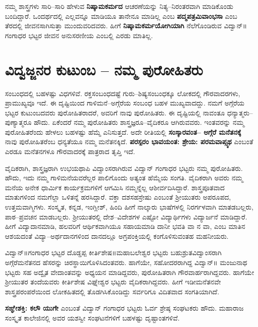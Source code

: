{ನಮ್ಮ ಶಾಸ್ತ್ರಗಳು ಸಾರಿ–ಸಾರಿ ಹೇಳುವ \textbf{ನಿಷ್ಕಾಮಕರ್ಮದ} ಆಚರಣೆಯನ್ನು ನಿತ್ಯ–ನಿರಂತರವಾಗಿ ಮಾಡಿಕೊಂಡು ಬಂದಿದ್ದಾರೆ. ಒಂದರ್ಥದಲ್ಲಿ ಎಲ್ಲವನ್ನೂ ಮಾಡಿಯೂ ತಾನೇನೂ ಮಾಡಿಲ್ಲ ಎಂಬ \textbf{ಪದ್ಮಪತ್ರಮಿವಾಂಭಸಾ} ಎಂಬ ತೆರದಲ್ಲಿ ಜೀವನಸಾಗಿಸುತ್ತಾ ಮುಂದುವರಿದವರು. ಹೀಗೆ \textbf{ನಿಷ್ಕಾಮಕರ್ಮಯೋಗಿಯಾಗಿ} ನೆಲೆಗೊಂಡಿರುವ ವಿದ್ವಾನ್॥ಗಂಗಾಧರ ಭಟ್ಟರ ಜೀವನ ಅನುಸರಣೀಯ ಎಂಬಲ್ಲಿ ಎರಡು ಮಾತಿಲ್ಲ.

\section*{ವಿದ್ವಜ್ಜನರ ಕುಟುಂಬ – ನಮ್ಮ ಪುರೋಹಿತರು}

ಸಂಬಂಧದಲ್ಲಿ ಬಹಳಷ್ಟು ವಿಧಗಳಿವೆ. ರಕ್ತಸಂಬಂಧದಷ್ಟೆ ಗುರು–ಶಿಷ್ಯಸಂಬಂಧಕ್ಕೂ ಲೋಕದಲ್ಲಿ ಗೌರವಾದರಗಳು, ಪ್ರಾಮುಖ್ಯವೂ ಇದೆ. ಈ ದೃಷ್ಟಿಯಿಂದ ಗಾಳಿಮನೆ–ಅಗ್ಗೆರೆಯ ಸಂಬಂಧ ಬಹಳ ಮುಖ್ಯವಾದದ್ದು.  ನಮಗೆ ಅಗ್ಗೆರೆಯ ಭಟ್ಟರ ಕುಟುಂಬದವರು ಪುರೋಹಿತರಾದರೆ, ಅವರಿಗೆ ನಾವು ಪುರೋಹಿತರು. ಈ ದೃಷ್ಟಿಯಲ್ಲಿ ನಾವಂತೂ ಧನ್ಯಾತ್ಮರು–ಪುಣ್ಯಾತ್ಮರೂ ಹೌದು. ಏಕೆಂದರೆ ನಮ್ಮ ಪುರೋಹಿತರು ಶಾಸ್ತ್ರಜ್ಞರೂ–ವೈದಿಕರೂ ಆಗಿರುವವರು. ಇಂತವರನ್ನು ನಮ್ಮ ಪುರೋಹಿತರೆಂದು ಹೇಳಲು ಬಹಳಷ್ಟು ಹೆಮ್ಮೆ ಎನಿಸುತ್ತದೆ. ಅದೇ ರೀತಿಯಲ್ಲಿ \textbf{ಸಂಸ್ಕಾರವಂತ– ಅಗ್ಗೆರೆ ಮನೆತನಕ್ಕೆ} ನಾವು ಪುರೋಹಿತರೆಂಬ ಧನ್ಯತೆಯೂ ನಮ್ಮ ಮನೆತನಕ್ಕಿದೆ. \textbf{ಪರಸ್ಪರಂ ಭಾವಯಂತ: ಶ್ರೇಯ: ಪರಮವಾಪ್ಸ್ಯಥ}  ಎಂಬಂತೆ ಎರಡೂ ಮನೆತನಗಳೂ ಗೌರವಾದರಕ್ಕೆ ಪಾತ್ರರಾದ ತೃಪ್ತಿ ಇದೆ. 

ವೈದಿಕರಾಗಿ, ಶಾಸ್ತ್ರಜ್ಞರಾಗಿ ಉಭಯಥಾಪಿ ವಿದ್ವಾಂಸರಾಗಿರುವ ವಿದ್ವಾನ್ ಗಂಗಾಧರ ಭಟ್ಟರು ನಮ್ಮ ಪುರೋಹಿತರು. ಹೌದು, ಇದು ನಮ್ಮ ಗಾಳಿಮನೆಯವರೆಲ್ಲರ ಪಾಲಿಗೊಂದು ಅತ್ಯಂತ ಹೆಮ್ಮೆಯ ಸಂಗತಿ. ವೈದಿಕರಾಗಿ ಅವರು ನಮ್ಮ ಮನೆಯ ಅನೇಕ ಧಾರ್ಮಿಕ ಕಾರ್ಯಕ್ರಮಗಳಿಗೆ ಆಗಮಿಸಿ ನಮ್ಮನ್ನೆಲ್ಲ ಆಶೀರ್ವದಿಸಿದ್ದಾರೆ. ಶಾಸ್ತ್ರಪೂತವಾದ ಮಾತುಗಳಿಂದ ನಮಗೆಲ್ಲಾ ಒಳಿತನ್ನೆ ಹರಸಿದ್ದಾರೆ. ವಕ್ತಾ ದಶಸಹಸ್ರೇಷು ಎಂಬಂತೆ ಶ್ರೀಯುತರು ಅಪರೂಪದ, ಉತ್ತಮವಾಗ್ಮಿಗಳು. ಸಂಸ್ಕೃತ, ಕನ್ನಡ, ಇಂಗ್ಲೀಶ್, ಹಿಂದಿ ಹೀಗೆ ನಾಲ್ಕಾರು ಭಾಷೆಗಳಲ್ಲಿ ನಿರರ್ಗಳವಾಗಿ ಮಾತಡಬಲ್ಲರು, ಪಾಠ–ಪ್ರವಚನ ಮಾಡಬಲ್ಲರು. ಶ್ರೀಯುತರಲ್ಲಿ ದೇಶ–ವಿದೇಶಗಳ ಎಷ್ಟೋ ವಿದ್ಯಾರ್ಥಿಗಳು ವಿದ್ಯಾರ್ಜನೆ ಮಾಡಿದ್ದಾರೆ. ಹೀಗೆ ವಿದ್ಯಾದಾನಮಾಡಿ, ಹಲವರಿಗೆ ಆರ್ಥಿಕವಾಗಿಯೂ ಸಹಾಯಮಾಡಿ ದಾನೀ ಭವತಿ ವಾ ನ ವಾ,  ಎಂಬ ಮಾತಿನ ಆಶಯದಂತೆ ವಿದ್ಯಾ–ಅರ್ಥದಾನಗಳಿಂದ ದಾನದಲ್ಲೂ ಅಗ್ರಪಂಕ್ತಿಯಲ್ಲಿ ಕಂಗೊಳಿಸುವಂತಹ ಮಹನೀಯರು. 

ವಿದ್ವಾನ್॥ಗಂಗಾಧರ ಭಟ್ಟರ ದೊಡ್ಡಪ್ಪ ಕೀರ್ತಿಶೇಷ॥ಮಹಾಬಲೇಶ್ವರ ಭಟ್ಟರು ಬಹುಶ್ರುತವಿದ್ವಾಂಸರಾಗಿ ಅಗ್ಗೆರೆಮನೆತನದ ಹೆಸರನ್ನು ಚಿರಸ್ಥಾಯಿಗೊಳಿಸಿದಂತವರು. ಹಾಗೆಯೇ, ಸಹೋದರರಾಗಿದ್ದ ವಿದ್ವಾನ್॥ ಮಂಜುನಾಥ ಭಟ್ಟರು ಸಹ ಅದ್ವೈತ ವೇದಾಂತವನ್ನು ಅಧ್ಯಯನ ಮಾಡಿದ್ದವರು, ಪುರೋಹಿತರಾಗಿ ಗೌರವಾರ್ಹರಾಗಿದ್ದವರು. ಹಾಗೆಯೇ ಶ್ರೀಯುತರ ತಂದೆಯವರು ಕೀರ್ತಿಶೇಷ ವಿಘ್ನೇಶ್ವರ ಭಟ್ಟರು ವೈದಿಕರಾಗಿದ್ದವರು. ಹೀಗೆ ಇಡೀಮನೆತನವೇ ಶಾಸ್ತ್ರಪರಂಪರೆಯಿಂದ ಲೋಕಹಿತದಲ್ಲಿ ತೊಡಗಿಸಿಕೊಂಡಿದ್ದು ಸರ್ವರಿಗೂ ವಿದಿತವಾದ ಸಂಗತಿಯಾಗಿದೆ. 

\textbf{ಸಙ್ಘೇಶಕ್ತಿ: ಕಲೌ ಯುಗೇ} ಎಂಬಂತೆ ವಿದ್ವಾನ್ ಗಂಗಾಧರ ಭಟ್ಟರು ಓರ್ವ ಶ್ರೇಷ್ಠ ಸಂಘಟಕರು ಹೌದು. ಮಹಾರಾಜ ಸಂಸ್ಕೃತ ಕಾಲೇಜಿನಲ್ಲಿ ಅವರ ಯಶಸ್ವೀ ಸಂಘಟನೆಗಳಿಗೆ ಬಹಳಷ್ಟು ದೃಷ್ಟಾಂತಗಳಿವೆ. 

}
